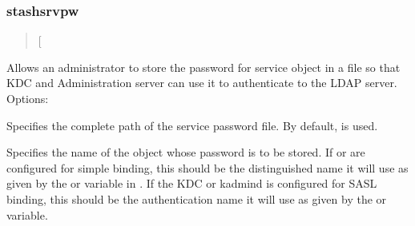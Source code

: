 \documentclass[letterpaper,10pt,english]{sphinxmanual}
\begin{document}
\begin{sphinxVerbatim}[commandchars=\\\{\}]
    
     
  
\end{sphinxVerbatim}


\subsubsection{stashsrvpw}
\label{\detokenize{admin/admin_commands/kdb5_ldap_util:stashsrvpw}}\label{\detokenize{admin/admin_commands/kdb5_ldap_util:kdb5-ldap-util-list-end}}\label{\detokenize{admin/admin_commands/kdb5_ldap_util:kdb5-ldap-util-stashsrvpw}}\begin{quote}

\sphinxAtStartPar
{}
{[} \sphinxstyleemphasis{filename}{]}
\end{quote}

\sphinxAtStartPar
Allows an administrator to store the password for service object in a
file so that KDC and Administration server can use it to authenticate
to the LDAP server.  Options:
\begin{description}
\sphinxAtStartPar
Specifies the complete path of the service password file. By
default,  is used.

\sphinxAtStartPar
Specifies the name of the object whose password is to be stored.
If {\hyperref[\detokenize{admin/admin_commands/krb5kdc:krb5kdc-8}]{}} or {\hyperref[\detokenize{admin/admin_commands/kadmind:kadmind-8}]{}} are configured for
simple binding, this should be the distinguished name it will
use as given by the  or 
variable in {\hyperref[\detokenize{admin/conf_files/kdc_conf:kdc-conf-5}]{}}.  If the KDC or kadmind is
configured for SASL binding, this should be the authentication
name it will use as given by the  or
 variable.

\end{description}
\end{document}
